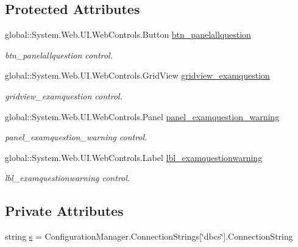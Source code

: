 \subsection*{Protected Attributes}
\begin{DoxyCompactItemize}
\item 
global\+::\+System.\+Web.\+U\+I.\+Web\+Controls.\+Button \mbox{\hyperlink{class_admin__question_a1221bfa7e5e9d6ef3a28ccb99829ce66}{btn\+\_\+panelallquestion}}
\begin{DoxyCompactList}\small\item\em btn\+\_\+panelallquestion control. \end{DoxyCompactList}\item 
global\+::\+System.\+Web.\+U\+I.\+Web\+Controls.\+Grid\+View \mbox{\hyperlink{class_admin__question_ae259ea86ecf4d0c89307bfba567b2e9f}{gridview\+\_\+examquestion}}
\begin{DoxyCompactList}\small\item\em gridview\+\_\+examquestion control. \end{DoxyCompactList}\item 
global\+::\+System.\+Web.\+U\+I.\+Web\+Controls.\+Panel \mbox{\hyperlink{class_admin__question_a84f1baacf0c95b2403bd55e55d1c0ad2}{panel\+\_\+examquestion\+\_\+warning}}
\begin{DoxyCompactList}\small\item\em panel\+\_\+examquestion\+\_\+warning control. \end{DoxyCompactList}\item 
global\+::\+System.\+Web.\+U\+I.\+Web\+Controls.\+Label \mbox{\hyperlink{class_admin__question_add1d44d49a54e916f5142e04dcc10565}{lbl\+\_\+examquestionwarning}}
\begin{DoxyCompactList}\small\item\em lbl\+\_\+examquestionwarning control. \end{DoxyCompactList}\end{DoxyCompactItemize}
\subsection*{Private Attributes}
\begin{DoxyCompactItemize}
\item 
string \mbox{\hyperlink{class_admin__question_ae58120e159e5c575bcfe0f8d75878c12}{s}} = Configuration\+Manager.\+Connection\+Strings\mbox{[}\char`\"{}dbcs\char`\"{}\mbox{]}.Connection\+String
\end{DoxyCompactItemize}


